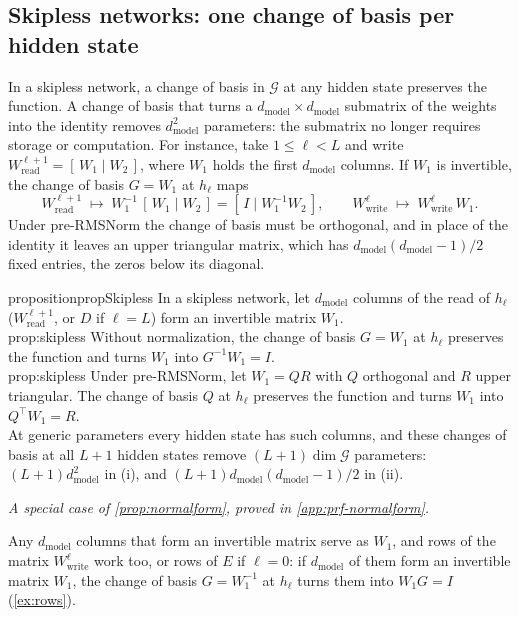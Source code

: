 \documentclass[10pt]{article}
\theoremstyle{definition}
\theoremstyle{remark}
\newcommand{\Wread}{W_{\mathrm{read}}}
\newcommand{\Wwrite}{W_{\mathrm{write}}}
\newcommand{\dm}{d_{\mathrm{model}}}
\newcommand{\G}{\mathcal{G}}
\newcommand{\ptlabel}[1]{\phantomsection\label{#1}}
\newcommand{\specialof}[2]{\par\vspace{-0.4\baselineskip}\noindent\hfill{\small\itshape A special case of \cref{#1}, proved in \cref{#2}.}\par\smallskip}
\newcommand{\stpart}[3]{\ifx\relax#1\relax\else\ptlabel{#1:#2}\fi{\upshape\bfseries\boldmath(#2)\ifx\relax#3\relax\else\ #3.\fi}}
\begin{document}
\subsection{Skipless networks: one change of basis per hidden state}\label{sec:skipless}\label{sec:junctions}

In a skipless network, a change of basis in $\G$ at any hidden state preserves the function. A change of basis that turns a $\dm\times\dm$ submatrix of the weights into the identity removes $\dm^2$ parameters: the submatrix no longer requires storage or computation. For instance, take $1 \le \ell < L$ and write $\Wread^{\ell+1} = [\,W_1 \mid W_2\,]$, where $W_1$ holds the first $\dm$ columns. If $W_1$ is invertible, the change of basis $G = W_1$ at $h_\ell$ maps
\[
\Wread^{\ell+1} \;\mapsto\; W_1^{-1}\,[\,W_1 \mid W_2\,] = [\,I \mid W_1^{-1}W_2\,], \qquad \Wwrite^{\ell} \;\mapsto\; \Wwrite^{\ell}\,W_1 .
\]
Under pre-RMSNorm the change of basis must be orthogonal, and in place of the identity it leaves an upper triangular matrix, which has $\dm(\dm-1)/2$ fixed entries, the zeros below its diagonal.

\begin{restatable}{proposition}{propSkipless}\label{prop:skipless}
In a skipless network, let $\dm$ columns of the read of $h_\ell$ ($\Wread^{\ell+1}$, or $D$ if $\ell = L$) form an invertible matrix $W_1$.\\
\stpart{prop:skipless}{i}{} Without normalization, the change of basis $G = W_1$ at $h_\ell$ preserves the function and turns $W_1$ into $G^{-1}W_1 = I$.\\
\stpart{prop:skipless}{ii}{} Under pre-RMSNorm, let $W_1 = QR$ with $Q$ orthogonal and $R$ upper triangular. The change of basis $Q$ at $h_\ell$ preserves the function and turns $W_1$ into $Q^\top W_1 = R$.\\
At generic parameters every hidden state has such columns, and these changes of basis at all $L+1$ hidden states remove $(L+1)\dim\G$ parameters: $(L+1)\dm^2$ in (i), and $(L+1)\dm(\dm-1)/2$ in (ii).
\end{restatable}
\specialof{prop:normalform}{app:prf-normalform}

Any $\dm$ columns that form an invertible matrix serve as $W_1$, and rows of the matrix $\Wwrite^{\ell}$ work too, or rows of $E$ if $\ell = 0$: if $\dm$ of them form an invertible matrix $W_1$, the change of basis $G = W_1^{-1}$ at $h_\ell$ turns them into $W_1G = I$ (\cref{ex:rows}).
\end{document}
